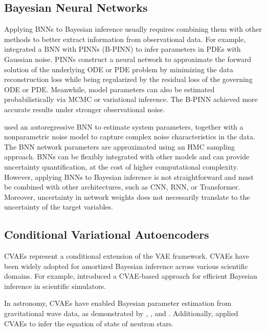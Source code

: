 \subsection{Bayesian Neural Networks}
Applying \acp{BNN} to Bayesian inference usually requires combining them with other methods to better extract information from observational data. For example, \citeauthor{YANG2021109913} \citeyearpar{YANG2021109913} integrated a \ac{BNN} with \acp{PINN} (B-PINN) to infer parameters in \acp{PDE} with Gaussian noise. \acp{PINN} construct a neural network to approximate the forward solution of the underlying \ac{ODE} or \ac{PDE} problem by minimizing the data reconstruction loss while being regularized by the residual loss of the governing \ac{ODE} or \ac{PDE}. Meanwhile, model parameters can also be estimated probabilistically via \ac{MCMC} or variational inference. The B-PINN achieved more accurate results under stronger observational noise. 

\citeauthor{Merkatas2023_sm} \citeyearpar{Merkatas2023_sm} used an autoregressive \ac{BNN} to estimate system parameters, together with a nonparametric noise model to capture complex noise characteristics in the data. The \ac{BNN} network parameters are approximated using an \ac{HMC} sampling approach. \acp{BNN} can be flexibly integrated with other models and can provide uncertainty quantification, at the cost of higher computational complexity. However, applying \acp{BNN} to Bayesian inference is not straightforward and must be combined with other architectures, such as CNN, RNN, or Transformer. Moreover, uncertainty in network weights does not necessarily translate to the uncertainty of the target variables.

\subsection{Conditional Variational Autoencoders}
\acp{CVAE} represent a conditional extension of the \acf{VAE} framework. \acp{CVAE} have been widely adopted for amortized Bayesian inference across various scientific domains. For example, \citeauthor{vae_sbi} \citeyearpar{vae_sbi} introduced a \ac{CVAE}-based approach for efficient Bayesian inference in scientific simulators.

In astronomy, \acp{CVAE} have enabled Bayesian parameter estimation from gravitational wave data, as demonstrated by \citeauthor{Yamamoto_2020rse} \citeyearpar{Yamamoto_2020rse}, \citeauthor{Gabbard2022} \citeyearpar{Gabbard2022}, and \citeauthor{Sun_2025} \citeyearpar{Sun_2025}. Additionally, \citeauthor{Ferreira_2025} \citeyearpar{Ferreira_2025} applied \acp{CVAE} to infer the equation of state of neutron stars. 

